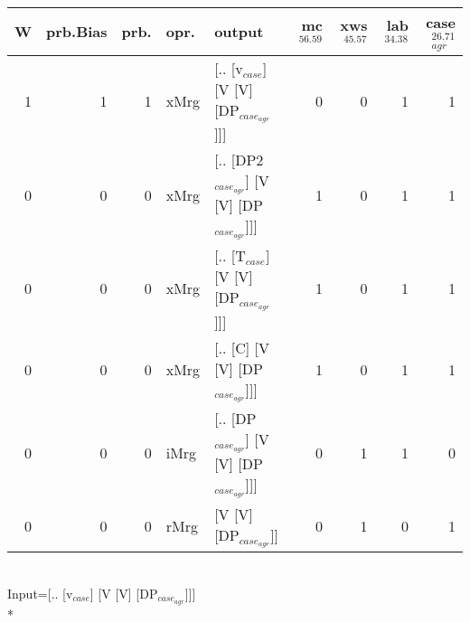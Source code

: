 \begin{tabularx}{\linewidth}{rrrlXrrrr}
\hline
   W &   prb.Bias &   prb. & opr.   & output                                    &   mc$^{56.59}$ &   xws$^{45.57}$ &   lab$^{34.38}$ &   case$_{agr}^{26.71}$ \\
\hline
   1 &       1 &   1 & xMrg & [.. [v$_{case}$] [V [V] [DP$_{case_{agr}}$]]]       &            0 &             0 &             1 &                  1 \\
   0 &       0 &   0 & xMrg & [.. [DP2$_{case_{agr}}$] [V [V] [DP$_{case_{agr}}$]]] &            1 &             0 &             1 &                  1 \\
   0 &       0 &   0 & xMrg & [.. [T$_{case}$] [V [V] [DP$_{case_{agr}}$]]]       &            1 &             0 &             1 &                  1 \\
   0 &       0 &   0 & xMrg & [.. [C] [V [V] [DP$_{case_{agr}}$]]]            &            1 &             0 &             1 &                  1 \\
   0 &       0 &   0 & iMrg & [.. [DP$_{case_{agr}}$] [V [V] [DP$_{case_{agr}}$]]]  &            0 &             1 &             1 &                  0 \\
   0 &       0 &   0 & rMrg & [V [V] [DP$_{case_{agr}}$]]                     &            0 &             1 &             0 &                  1 \\
\hline
\end{tabularx}\endgroup\\
\begingroup\scriptsize Input=[.. [v$_{case}$] [V [V] [DP$_{case_{agr}}$]]]\\*
